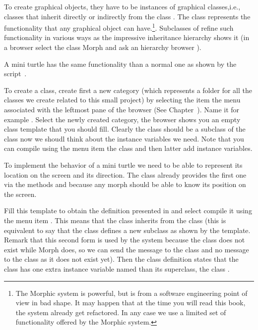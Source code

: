 To create graphical objects, they have to be instances of graphical
classes,i.e.,  classes that inherit directly or indirectly from the class
. The class  represents the functionality that any 
graphical object can have.\footnote{The Morphic system is powerful,
but is from a software engineering point of view in bad shape. It may
happen that at the time you will read this book, the system already
get refactored. In any case we use a limited set of functionality
offered by the Morphic system.}. Subclasses of  refine such
functionality in various ways as the impressive inheritance hierarchy
shows it (in a browser select the class Morph and ask an hierarchy
browser ).

A mini turtle has the same functionality than a normal one as shown by
the script~.

To create a class, create first a new category (which represents a
folder for all the classes we create related to this small project) by
selecting the item  the menu associated with the
leftmost pane of the browser (See Chapter~).
Name it for example . Select the newly created
category, the browser shows you an empty class template that you
should fill.  Clearly the class \mtc should be a subclass of
the class  now we shoudl think about the instance variables
we need. Note that you can compile using the  menu item
the class and then latter add instance variables.

To implement the behavior of a mini turtle we need to be able to
represent its location on the screen and its direction. The class
 already provides the first one via the methods
 and  because any morph should be able to
know its position on the screen. 

Fill this template to obtain the definition presented in
 and select compile it using the menu item
. This means that the class \mtc inherits from the class
 (this is equivalent to say that the class 
defines a new subclass as shown by the template. Remark that this
second form is used by the system because the class \mtc does not
exist while Morph does, so we can send the message 
to the class  and no message to the class \mtc as it does
not exist yet).  Then the class definition states that the class \mtc
has one extra instance variable named  than its
superclass, the class .

